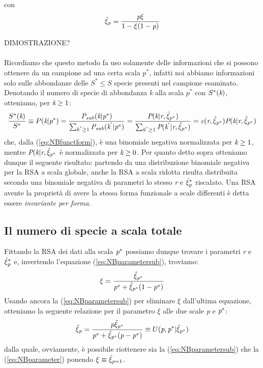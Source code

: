 con 
\begin{equation}
    \hat\xi_{\emph{p}}=\frac{\emph{p}\xi}{1-\xi(1-\emph{p})}
\label{eq:NBparametersub}
\end{equation}

DIMOSTRAZIONE?\\
\\
Ricordiamo che questo metodo fa uso solamente delle informazioni che si possono ottenere da un campione ad una certa scala $p^*$, infatti noi abbiamo informazioni solo sulle abbondanze delle $S^*\le S$ specie presenti nel campione esaminato. Denotando il numero di specie di abbondanza \emph{k} alla scala $p^*$ con $S^*(\emph{k})$, otteniamo, per $\emph{k}\ge 1$:
\begin{equation}
    \frac{S^*(\emph{k})}{S^*}\equiv P(\emph{k}|\emph{p}^*)=\frac{\emph{P}_\emph{sub}(\emph{k}|\emph{p}^*)}{\sum_{k^{'} \ge 1}^{} \emph{P}_\emph{sub}(\emph{k}^{'}|\emph{p}^{*})}
    =\frac{\emph{P}(\emph{k}|\emph{r},\hat\xi_{\emph{p}^*})}{\sum_{k^{'} \ge 1}^{} \emph{P}(\emph{k}^{'}|\emph{r},\hat \xi_{\emph{p}^*})}
    =\emph{c}(\emph{r},\hat\xi_{\emph{p}^*})\emph{P}(\emph{k}|\emph{r},\hat \xi_{\emph{p}^*})
    \label{eq:SstarRSA}
\end{equation}
che, dalla (\ref{eq:NBfunctform}), è una binomiale negativa normalizzata per $\emph{k}\ge 1$, mentre $\emph{P}(\emph{k}|\emph{r},\hat \xi_{\emph{p}^*}$ è normalizzata per $\emph{k}\ge 0$.
Per quanto detto sopra otteniamo dunque il seguente risultato: partendo da una distribuzione binomiale negativa per la RSA a scala globale, anche la RSA a scala ridotta risulta distribuita secondo una binomiale negativa di parametri lo stesso \emph{r} e $\hat \xi_\emph{p}^*$ riscalato.
Una RSA avente la proprietà di avere la stessa forma funzionale a scale differenti è detta essere \emph{invariante per forma}.

\subsection{Il numero di specie a scala totale}
Fittando la RSA dei dati alla scala $\emph{p}^*$ possiamo dunque trovare i parametri \emph{r} e $\hat \xi_\emph{p}^*$ e, invertendo l'equazione (\ref{eq:NBparametersub}), troviamo:
\begin{equation}
    \xi=\frac{\hat \xi_{\emph{p}^*}}{\emph{p}^*+\hat \xi_{\emph{p}^*}(1-\emph{p}^*)}
\label{eq:NBparameter}
\end{equation}
Usando ancora la (\ref{eq:NBparametersub}) per eliminare $\xi$ dall'ultima equazione, otteniamo la seguente relazione per il parametro $\xi$ alle due scale \emph{p} e $\emph{p}^*$:
\begin{equation}
    \hat\xi_\emph{p}=\frac{p \hat \xi_{\emph{p}^*}}{\emph{p}^*+\hat\xi_{\emph{p}^*}(\emph{p}-\emph{p}^*)}\equiv U(\emph{p},\emph{p}^*|\hat \xi_{\emph{p}^*})
    \label{eq:xihatp}
\end{equation}
dalla quale, ovviamente, è possibile riottenere sia la (\ref{eq:NBparametersub}) che la (\ref{eq:NBparameter}) ponendo $\xi \equiv \hat \xi_{\emph{p}=1} $.


